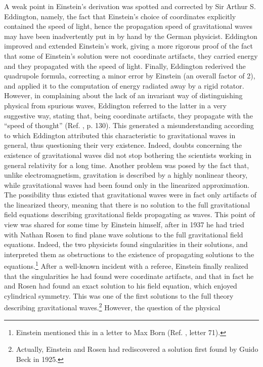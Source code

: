 \documentclass{ws-procs961x669}            %
\begin{document}
A weak point in Einstein's derivation was spotted and corrected by
Sir Arthur S. Eddington\cite{Eddington:1922ds}, namely, the fact
that Einstein's choice of coordinates explicitly contained the
speed of light, hence the propagation speed of gravitational waves
may have been inadvertently put in by hand by the German
physicist. Eddington improved and extended Einstein's work, giving
a more rigorous proof of the fact that some of Einstein's solution
were not coordinate artifacts, they carried energy and they
propagated with the speed of light. Finally, Eddington rederived
the quadrupole formula, correcting a minor error by Einstein (an
overall factor of 2), and applied it to the computation of energy
radiated away by a rigid rotator. However, in complaining about
the lack of an invariant way of distinguishing physical from
spurious waves, Eddington referred to the latter in a very
suggestive way, stating that, being coordinate artifacts, they
propagate with the ``speed of thought'' (Ref. ,
p. 130). This generated a misunderstanding according to which
Eddington attributed this characteristic to gravitational waves in
general, thus questioning their very existence. Indeed, doubts
concerning the existence of gravitational waves did not stop
bothering the scientists working in general relativity for a long
time. Another problem was posed by the fact that, unlike
electromagnetism, gravitation is described by a highly nonlinear
theory, while gravitational waves had been found only in the
linearized approximation. The possibility thus existed that
gravitational waves were in fact only artifacts of the linearized
theory, meaning that there is no solution to the full
gravitational field equations describing gravitational fields
propagating as waves. This point of view was shared for some time
by Einstein himself, after in 1937 he had tried with Nathan Rosen
to find plane wave solutions to the full gravitational field
equations\cite{EinsteinRosen1937}. Indeed, the two physicists
found singularities in their solutions, and interpreted them as
obstructions to the existence of propagating solutions to the
equations.\footnote{Einstein mentioned this in a letter to Max
Born (Ref. , letter 71).} After a well-known
incident with a referee\cite{KennefickPTOD}, Einstein finally
realized that the singularities he had found were coordinate
artifacts, and that in fact he and Rosen had found an exact
solution to his field equation, which enjoyed cylindrical
symmetry. This was one of the first solutions to the full theory
describing gravitational waves.\footnote{Actually, Einstein and
Rosen had rediscovered a solution first found by Guido Beck in
1925\cite{Beck:1925mm}.} However, the question of the physical
\end{document}
